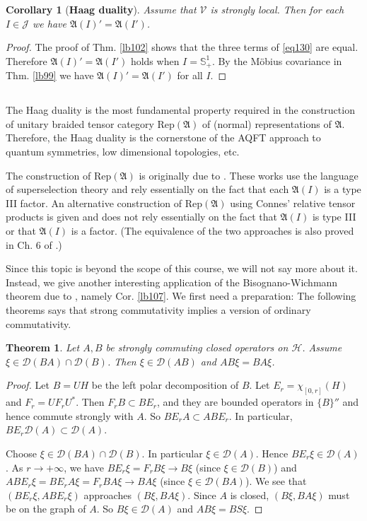 \documentclass[12pt,b5paper,notitlepage]{article}
\theoremstyle{definition}
\theoremstyle{plain}
\newtheorem{thm}[df]{Theorem}
\newtheorem{co}[df]{Corollary}
\newcommand{\fk}{\mathfrak}
\newcommand{\mc}{\mathcal}
\newcommand{\Rep}{\mathrm{Rep}}
\newcommand{\Dom}{\scr{D}}
\newcommand{\scr}{\mathscr}
\newcommand{\Sbb}{{\mathbb S}}
\newcommand{\MV}{\mathcal V}
\numberwithin{equation}{section}
\begin{document}
\begin{co}[\textbf{Haag duality}]\label{lb103}
Assume that $\MV$ is strongly local. Then for each $I\in\mc J$ we have $\fk A(I)'=\fk A(I')$.
\end{co}

\begin{proof}
The proof of Thm. \ref{lb102} shows that the three terms of \eqref{eq130} are equal. Therefore $\fk A(I)'=\fk A(I')$ holds when $I=\Sbb^1_+$. By the M\"obius covariance in Thm. \ref{lb99} we have $\fk A(I)'=\fk A(I')$ for all $I$.
\end{proof}




\subsection{}


The Haag duality is the most fundamental property required in the construction of unitary braided tensor category $\Rep(\fk A)$ of (normal) representations of $\fk A$. Therefore, the Haag duality is the cornerstone of the AQFT approach to quantum symmetries, low dimensional topologies, etc.

The construction of $\Rep(\fk A)$ is originally due to \cite{FRS89,FRS92}. These works use the language of superselection theory and rely essentially on the fact that each $\fk A(I)$ is a type III factor. An alternative construction of $\Rep(\fk A)$ using Connes' relative tensor products is given \cite{Gui21} and does not rely essentially on the fact that $\fk A(I)$ is type III or that $\fk A(I)$ is a factor. (The equivalence of the two approaches is also proved in Ch. 6 of \cite{Gui21}.)

Since this topic is beyond the scope of this course, we will not say more about it. Instead, we give another interesting application of the Bisognano-Wichmann theorem due to \cite{CKLW18}, namely Cor. \ref{lb107}. We first need a preparation: The following theorems says that strong commutativity implies a version of ordinary commutativity.


\begin{thm}\label{lb104}
Let $A,B$ be strongly commuting closed operators on $\mc H$. Assume $\xi\in\Dom(BA)\cap\Dom(B)$. Then $\xi\in\Dom(AB)$ and $AB\xi=BA\xi$.
\end{thm}


\begin{proof}
Let $B=UH$ be the left polar decomposition of $B$. Let $E_r=\chi_{[0,r]}(H)$ and $F_r=UF_rU^*$. Then $F_rB\subset BE_r$, and they are bounded operators in $\{B\}''$ and hence commute strongly with $A$. So $BE_rA\subset ABE_r$. In particular, $BE_r\Dom(A)\subset\Dom(A)$. 

Choose $\xi\in\Dom(BA)\cap\Dom(B)$. In particular $\xi\in\Dom(A)$. Hence $BE_r\xi\in\Dom(A)$. As $r\rightarrow+\infty$, we have $BE_r\xi=F_rB\xi\rightarrow B\xi$ (since $\xi\in\Dom(B)$) and $ABE_r\xi=BE_rA\xi=F_rBA\xi\rightarrow BA\xi$ (since $\xi\in\Dom(BA)$). We see that $(BE_r\xi,ABE_r\xi)$ approaches $(B\xi,BA\xi)$. Since $A$ is closed, $(B\xi,BA\xi)$ must be on the graph of $A$. So $B\xi\in\Dom(A)$ and $AB\xi=BS\xi$.
\end{proof}
\end{document}
